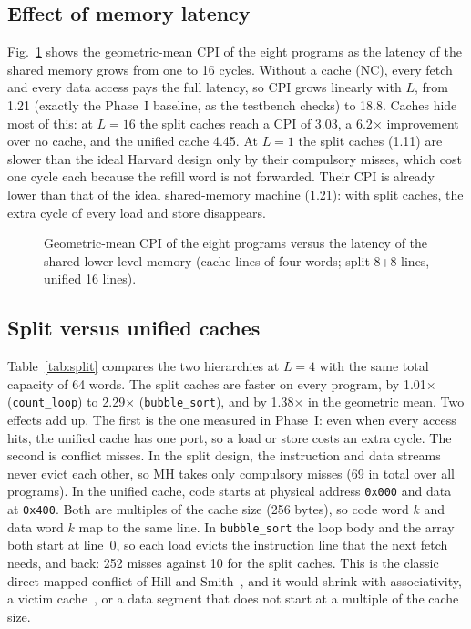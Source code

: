 \documentclass[conference]{IEEEtran}
\begin{document}
\subsection{Effect of memory latency}
Fig.~\ref{fig:latency} shows the geometric-mean CPI of the eight programs as
the latency of the shared memory grows from one to 16 cycles. Without a cache
(NC), every fetch and every data access pays the full latency, so CPI grows
linearly with $L$, from 1.21 (exactly the Phase~I baseline, as the testbench
checks) to 18.8. Caches hide most of this: at $L=16$ the split caches reach a
CPI of 3.03, a 6.2$\times$ improvement over no cache, and the unified cache
4.45. At $L=1$ the split caches (1.11) are slower than the ideal Harvard
design only by their compulsory misses, which cost one cycle each because
the refill word is not forwarded. Their CPI is already lower than that of
the ideal shared-memory machine (1.21): with split caches, the extra cycle of
every load and store disappears.

\begin{figure}[t]
\centering

\caption{Geometric-mean CPI of the eight programs versus the latency of the shared lower-level memory (cache lines of four words; split 8+8 lines, unified 16 lines).}
\label{fig:latency}
\end{figure}

\subsection{Split versus unified caches}
Table~\ref{tab:split} compares the two hierarchies at $L=4$ with the same
total capacity of 64 words. The split caches are faster on every program, by
1.01$\times$ (\texttt{count\_loop}) to 2.29$\times$ (\texttt{bubble\_sort}),
and by 1.38$\times$ in the geometric mean. Two effects add up. The first is
the one measured in Phase~I: even when every access hits, the unified cache
has one port, so a load or store costs an extra cycle. The second is
conflict misses. In the split design, the instruction and data streams never
evict each other, so MH takes only compulsory misses (69 in total over all
programs). In the unified cache, code starts at physical address
\texttt{0x000} and data at \texttt{0x400}. Both are multiples of the cache
size (256 bytes), so code word $k$ and data word $k$ map to the same line.
In \texttt{bubble\_sort} the loop body and the array both start at line~0,
so each load evicts the instruction line that the next fetch needs, and back:
252 misses against 10 for the split caches. This is the classic
direct-mapped conflict of Hill and Smith~\cite{hill1989}, and it would shrink
with associativity, a victim cache~\cite{jouppi1990}, or a data segment that
does not start at a multiple of the cache size.
\end{document}
